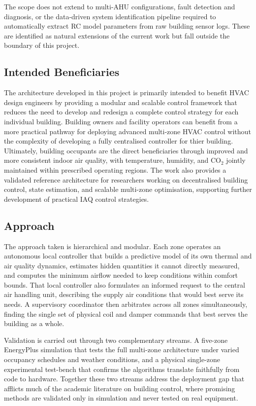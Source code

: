 \documentclass[12pt, a4paper]{article}
\begin{document}
	The scope does not extend to multi-AHU configurations, fault detection and diagnosis, or the data-driven system identification pipeline required to automatically extract RC model parameters from raw building sensor logs. These are identified as natural extensions of the current work but fall outside the boundary of this project.
	
	\subsection{Intended Beneficiaries}
	
	The architecture developed in this project is primarily intended to benefit HVAC design engineers by providing a modular and scalable control framework that reduces the need to develop and redesign a complete control strategy for each individual building. Building owners and facility operators can benefit from a more practical pathway for deploying advanced multi-zone HVAC control without the complexity of developing a fully centralised controller for thier building. Ultimately, building occupants are the direct beneficiaries through improved and more consistent indoor air quality, with temperature, humidity, and CO$_2$ jointly maintained within prescribed operating regions. The work also provides a validated reference architecture for researchers working on decentralised building control, state estimation, and scalable multi-zone optimisation, supporting further development of practical IAQ control strategies.


	\subsection{Approach}
	
	The approach taken is hierarchical and modular. Each zone operates an autonomous local controller that builds a predictive model of its own thermal and air quality dynamics, estimates hidden quantities it cannot directly measured, and computes the minimum airflow needed to keep conditions within comfort bounds. That local controller also formulates an informed request to the central air handling unit, describing the supply air conditions that would best serve its needs. A supervisory coordinator then arbitrates across all zones simultaneously, finding the single set of physical coil and damper commands that best serves the building as a whole.
	
	Validation is carried out through two complementary streams. A five-zone EnergyPlus simulation that tests the full multi-zone architecture under varied occupancy schedules and weather conditions, and a physical single-zone experimental test-bench that confirms the algorithms translate faithfully from code to hardware. Together these two streams address the deployment gap that afflicts much of the academic literature on building control, where promising methods are validated only in simulation and never tested on real equipment.
	
\end{document}
